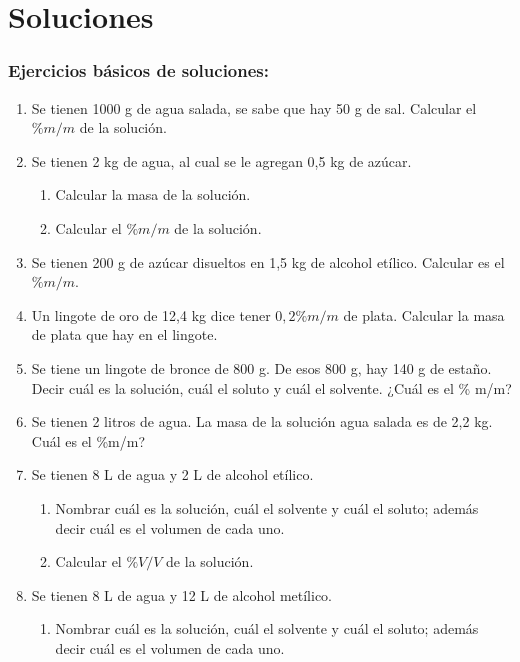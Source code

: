 \section{Soluciones}

\subsubsection*{Ejercicios básicos de soluciones:}

\begin{enumerate}
\item Se tienen 1000 g de agua salada, se sabe que hay 50 g de sal. Calcular el $\%m/m$ de la solución.

\item Se tienen 2 kg de agua, al cual se le agregan 0,5 kg de azúcar.
\begin{enumerate}
    \item Calcular la masa de la solución.
    \item Calcular el $\%m/m$ de la solución. 
\end{enumerate}

\item Se tienen 200 g de azúcar disueltos en 1,5 kg de alcohol etílico. Calcular es el $\%m/m$. %

\item Un lingote de oro de 12,4 kg dice tener $0,2\%m/m$ de plata. Calcular la masa de plata que hay en el lingote.

\item Se tiene un lingote de bronce de 800 g. De esos 800 g, hay 140 g de estaño. Decir cuál es la solución, cuál el soluto y cuál el solvente. ¿Cuál es el \% m/m? %

\item Se tienen 2 litros de agua. La masa de la solución agua salada es de 2,2 kg. Cuál es el \%m/m? %

\item Se tienen 8 L de agua y 2 L de alcohol etílico. 
\begin{enumerate}
    \item Nombrar cuál es la solución, cuál el solvente y cuál el soluto; además decir cuál es el volumen de cada uno.
    
    \item Calcular el $\%V/V$ de la solución.
\end{enumerate}

\item Se tienen 8 L de agua y 12 L de alcohol metílico. 
\begin{enumerate}
    \item Nombrar cuál es la solución, cuál el solvente y cuál el soluto; además decir cuál es el volumen de cada uno.


\end{enumerate}
\end{enumerate}
